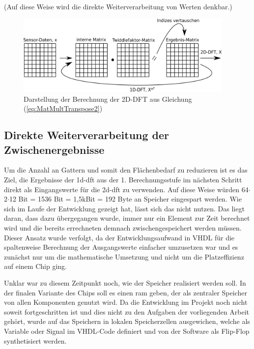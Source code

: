 (Auf diese Weise wird die direkte Weiterverarbeitung von Werten denkbar.)
 
\begin{figure}[htbp]
 \centering
 \includegraphics[width=0.95\textwidth]{img/MatMultTranspose2.png}
 \caption{Darstellung der Berechnung der 2D-DFT aus Gleichung (\ref{eq:MatMultTranspose2})}
 \label{pic:MatMultTranspose}
\end{figure}


\subsection{Direkte Weiterverarbeitung der Zwischenergebnisse}
Um die Anzahl an Gattern und somit den Flächenbedarf zu reduzieren ist es das Ziel, die Ergebnisse der \gls{1d-dft} aus der 1. Berechnungsstufe im nächsten Schritt direkt als 
Eingangswerte für die \gls{2d-dft} zu verwenden. Auf diese Weise würden 64$\cdot$2$\cdot$12 Bit = 1536 Bit = 1,5kBit = 192 Byte an Speicher eingespart werden.
Wie sich im Laufe der Entwicklung gezeigt hat, lässt sich das nicht nutzen. Das liegt daran, dass dazu übergegangen wurde, immer nur ein Element zur Zeit berechnet wird und die 
bereits errechneten demnach zwischengespeichert werden müssen. Dieser Ansatz wurde verfolgt, da der Entwicklungsaufwand in VHDL für die spaltenweise Berechnung der Ausgangswerte 
einfacher umzusetzen war und es zunächst nur um die mathematische Umsetzung und nicht um die Platzeffizienz auf einem Chip ging.

Unklar war zu diesem Zeitpunkt noch, wie der Speicher realisiert werden soll. In der finalen Variante des Chips soll es einen \gls{ram} geben, der als zentraler
Speicher von allen Komponenten genutzt wird. Da die Entwicklung im Projekt noch nicht soweit fortgeschritten ist und dies nicht zu den Aufgaben der vorliegenden Arbeit gehört,
wurde auf das Speichern in lokalen Speicherzellen ausgewichen, welche als Variable oder Signal im VHDL-Code definiert und von der Software als Flip-Flop synthetisiert werden.




